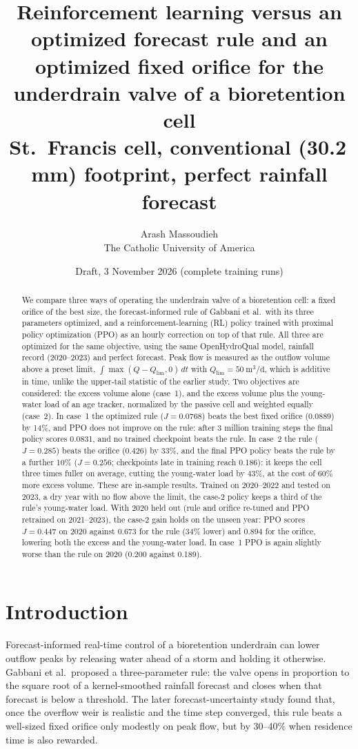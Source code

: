 \documentclass[11pt]{article}
\title{Reinforcement learning versus an optimized forecast rule and an optimized fixed orifice
for the underdrain valve of a bioretention cell\\[4pt]
\large St.~Francis cell, conventional (30.2\,mm) footprint, perfect rainfall forecast}
\author{Arash Massoudieh\\ \small The Catholic University of America}
\date{Draft, 3 November 2026 (complete training runs)}
\begin{document}
\maketitle

\begin{abstract}
We compare three ways of operating the underdrain valve of a bioretention cell: a fixed
orifice of the best size, the forecast-informed rule of Gabbani et al.\ with its three
parameters optimized, and a reinforcement-learning (RL) policy trained with proximal policy
optimization (PPO) as an hourly correction on top of that rule. All three are optimized for
the same objective, using the same OpenHydroQual model, rainfall record (2020--2023) and
perfect forecast. Peak flow is measured as the outflow volume above a preset limit,
$\int \max(Q - Q_{\lim}, 0)\,dt$ with $Q_{\lim} = \SI{50}{\m^3\per\day}$, which is additive in
time, unlike the upper-tail statistic of the earlier study. Two objectives are considered:
the excess volume alone (case~1), and the excess volume plus the young-water load of an age
tracker, normalized by the passive cell and weighted equally (case~2). In case~1 the
optimized rule ($J = 0.0768$) beats the best fixed orifice ($0.0889$) by 14\%, and PPO does
not improve on the rule: after 3 million training steps the final policy scores 0.0831,
and no trained checkpoint beats the rule. In case~2 the rule ($J = 0.285$) beats the
orifice ($0.426$) by 33\%, and the final PPO policy beats the rule by a further 10\%
($J = 0.256$; checkpoints late in training reach 0.186): it keeps the cell three times
fuller on average, cutting the young-water load by 43\%, at the cost of 60\% more excess
volume. These are in-sample results. Trained on 2020--2022 and tested on 2023, a dry year
with no flow above the limit, the case-2 policy keeps a third of the rule's young-water
load. With 2020 held out (rule and orifice re-tuned and PPO
retrained on 2021--2023), the case-2 gain holds on the unseen year: PPO scores $J = 0.447$
on 2020 against $0.673$ for the rule (34\% lower) and $0.894$ for the orifice, lowering both
the excess and the young-water load. In case~1 PPO is again slightly worse than the rule on
2020 (0.200 against 0.189).
\end{abstract}

\section{Introduction}
Forecast-informed real-time control of a bioretention underdrain can lower outflow peaks
by releasing water ahead of a storm and holding it otherwise. Gabbani et al.\ proposed a
three-parameter rule: the valve opens in proportion to the square root of a kernel-smoothed
rainfall forecast and closes when that forecast is below a threshold. The later
forecast-uncertainty study found that, once the overflow weir is realistic and the time step
converged, this rule beats a well-sized fixed orifice only modestly on peak flow, but by
30--40\% when residence time is also rewarded.
\end{document}
